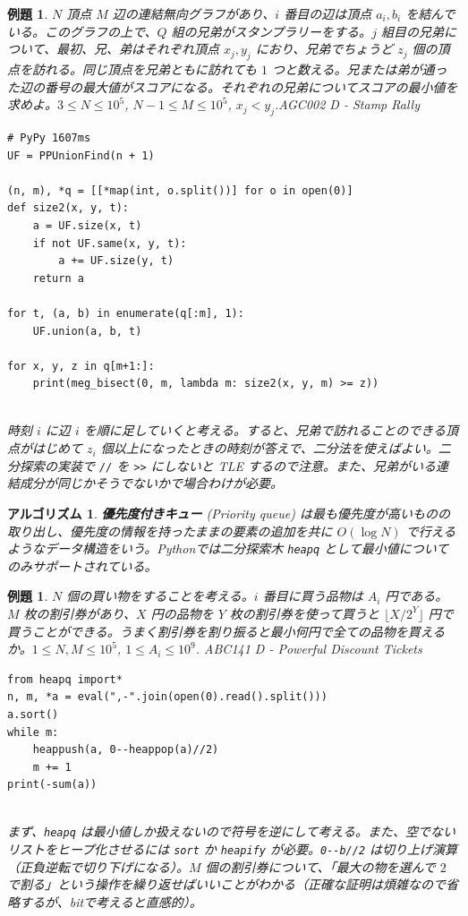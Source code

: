 \documentclass[12pt, a4j]{ltjsarticle}
\newtheorem{alg}[thm]{アルゴリズム}
\newtheorem{exm}[thm]{例題}
\newcommand*{\SS}{\vspace{1cm}}
\begin{document}
\SS

\begin{exm} $N$ 頂点 $M$ 辺の連結無向グラフがあり、$i$ 番目の辺は頂点 $a_i,b_i$ を結んでいる。このグラフの上で、$Q$ 組の兄弟がスタンプラリーをする。$j$ 組目の兄弟について、最初、兄、弟はそれぞれ頂点 $x_j,y_j$ におり、兄弟でちょうど $z_j$ 個の頂点を訪れる。同じ頂点を兄弟ともに訪れても $1$ つと数える。兄または弟が通った辺の番号の最大値がスコアになる。それぞれの兄弟についてスコアの最小値を求めよ。$3\le N\le 10^5$, $N-1\le M\le 10^5$, $x_j<y_j$.\quad\upshape AGC002 D - Stamp Rally\\
\begin{lstlisting}
# PyPy 1607ms
UF = PPUnionFind(n + 1)

(n, m), *q = [[*map(int, o.split())] for o in open(0)]
def size2(x, y, t):
    a = UF.size(x, t)
    if not UF.same(x, y, t):
        a += UF.size(y, t)
    return a

for t, (a, b) in enumerate(q[:m], 1):
    UF.union(a, b, t)

for x, y, z in q[m+1:]:
    print(meg_bisect(0, m, lambda m: size2(x, y, m) >= z))
\end{lstlisting}\quad\\
時刻 $i$ に辺 $i$ を順に足していくと考える。すると、兄弟で訪れることのできる頂点がはじめて $z_i$ 個以上になったときの時刻が答えで、二分法を使えばよい。二分探索の実装で \lstinline{//} を \lstinline{>>} にしないと TLE するので注意。また、兄弟がいる連結成分が同じかそうでないかで場合わけが必要。
\end{exm}

\SS

\begin{alg} {\bf 優先度付きキュー} (Priority queue) は最も優先度が高いものの取り出し、優先度の情報を持ったままの要素の追加を共に $O(\log N)$ で行えるようなデータ構造をいう。Pythonでは二分探索木 \lstinline{heapq} として最小値についてのみサポートされている。
\end{alg}

\SS

\begin{exm} $N$ 個の買い物をすることを考える。$i$ 番目に買う品物は $A_i$ 円である。$M$ 枚の割引券があり、$X$ 円の品物を $Y$ 枚の割引券を使って買うと $\lfloor X/2^Y \rfloor$ 円で買うことができる。うまく割引券を割り振ると最小何円で全ての品物を買えるか。$1\le N,M\le 10^5$, $1\le A_i\le 10^9$. \upshape\quad ABC141 D - Powerful Discount Tickets\\
\begin{lstlisting}
from heapq import*
n, m, *a = eval(",-".join(open(0).read().split()))
a.sort()
while m:
    heappush(a, 0--heappop(a)//2)
    m += 1
print(-sum(a))
\end{lstlisting}\quad\\
まず、\lstinline{heapq} は最小値しか扱えないので符号を逆にして考える。また、空でないリストをヒープ化させるには \lstinline{sort} か \lstinline{heapify} が必要。\lstinline{0--b//2} は切り上げ演算（正負逆転で切り下げになる）。$M$ 個の割引券について、「最大の物を選んで $2$ で割る」という操作を繰り返せばいいことがわかる（正確な証明は煩雑なので省略するが、bitで考えると直感的）。
\end{exm}
\end{document}
